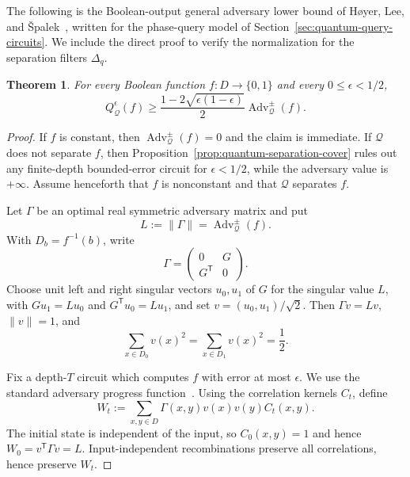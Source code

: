 \documentclass[11pt]{article}
\numberwithin{equation}{section}
\newtheorem{theorem}[definition]{Theorem}
\theoremstyle{remark}
\begin{document}
The following is the Boolean-output general adversary lower bound of H{\o}yer, Lee, and {\v S}palek~\cite[Theorem~2]{HoyerLeeSpalek2007}, written for the phase-query model of Section~\ref{sec:quantum-query-circuits}. We include the direct proof to verify the normalization for the separation filters $\Delta_q$.

\begin{theorem}
\label{thm:adversary-query-lower-bound}
For every Boolean function $f:D\to\{0,1\}$ and every
$0\leq\epsilon<1/2$,
\begin{equation}
    Q_{\mathcal Q}^{\epsilon}(f)
    \geq
    \frac{1-2\sqrt{\epsilon(1-\epsilon)}}{2}
    \operatorname{Adv}^{\pm}_{\mathcal Q}(f).
\end{equation}
\end{theorem}

\begin{proof}
If $f$ is constant, then $\operatorname{Adv}^{\pm}_{\mathcal Q}(f)=0$ and
the claim is immediate. If $\mathcal Q$ does not separate $f$, then
Proposition~\ref{prop:quantum-separation-cover} rules out any finite-depth
bounded-error circuit for $\epsilon<1/2$, while the adversary value is
$+\infty$. Assume henceforth that $f$ is nonconstant and that $\mathcal Q$
separates $f$.

Let $\Gamma$ be an optimal real symmetric adversary matrix and put
\begin{equation}
    L:=\|\Gamma\|=\operatorname{Adv}^{\pm}_{\mathcal Q}(f).
\end{equation}
With $D_b=f^{-1}(b)$, write
\begin{equation}
    \Gamma=
    \begin{pmatrix}
        0&G\\
        G^{\mathsf T}&0
    \end{pmatrix}.
\end{equation}
Choose unit left and right singular vectors $u_0,u_1$ of $G$ for the singular
value $L$, with $Gu_1=Lu_0$ and $G^{\mathsf T}u_0=Lu_1$, and set
$v=(u_0,u_1)/\sqrt2$. Then $\Gamma v=Lv$, $\|v\|=1$, and
\begin{equation}
    \sum_{x\in D_0}v(x)^2
    =
    \sum_{x\in D_1}v(x)^2
    =\frac12.
\end{equation}

Fix a depth-$T$ circuit which computes $f$ with error at most $\epsilon$. We use the standard adversary progress function~\cite{BarnumSaksSzegedy2003,HoyerLeeSpalek2007}. Using the correlation kernels $C_t$, define
\begin{equation}
    W_t
    :=
    \sum_{x,y\in D}
        \Gamma(x,y)v(x)v(y)C_t(x,y).
\end{equation}
The initial state is independent of the input, so $C_0(x,y)=1$ and hence
$W_0=v^{\mathsf T}\Gamma v=L$. Input-independent recombinations preserve all
correlations, hence preserve $W_t$.


\end{proof}
\end{document}
